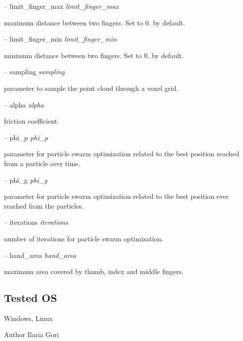 -- limit\+\_\+finger\+\_\+max {\itshape limit\+\_\+finger\+\_\+max} 
\begin{DoxyItemize}
\item maximum distance between two fingers. Set to 0. by default.
\end{DoxyItemize}

-- limit\+\_\+finger\+\_\+min {\itshape limit\+\_\+finger\+\_\+min} 
\begin{DoxyItemize}
\item minimum distance between two fingers. Set to 0. by default.
\end{DoxyItemize}

-- sampling {\itshape sampling} 
\begin{DoxyItemize}
\item parameter to sample the point cloud through a voxel grid.
\end{DoxyItemize}

-- alpha {\itshape alpha} 
\begin{DoxyItemize}
\item friction coefficient.
\end{DoxyItemize}

-- phi\+\_\+p {\itshape phi\+\_\+p} 
\begin{DoxyItemize}
\item parameter for particle swarm optimization related to the best position reached from a particle over time.
\end{DoxyItemize}

-- phi\+\_\+g {\itshape phi\+\_\+g} 
\begin{DoxyItemize}
\item parameter for particle swarm optimization related to the best position ever reached from the particles.
\end{DoxyItemize}

-- iterations {\itshape iterations} 
\begin{DoxyItemize}
\item number of iterations for particle swarm optimization.
\end{DoxyItemize}

-- hand\+\_\+area {\itshape hand\+\_\+area} 
\begin{DoxyItemize}
\item maximum area covered by thumb, index and middle fingers.
\end{DoxyItemize}\hypertarget{group__handIKModule_tested_os_sec}{}\subsection{Tested OS}\label{group__handIKModule_tested_os_sec}
Windows, Linux

\begin{DoxyAuthor}{Author}
Ilaria Gori 
\end{DoxyAuthor}

